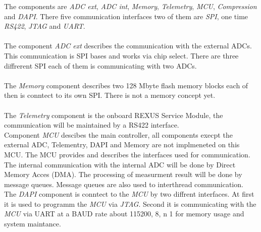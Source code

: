 The components are \textit{ADC ext}, \textit{ADC int}, \textit{Memory}, \textit{Telemetry}, \textit{MCU}, \textit{Compression} and \textit{DAPI}. There five communication interfaces two of them are \textit{SPI}, one time \textit{RS422}, \textit{JTAG} and \textit{UART}.\\ \\
The component \textit{ADC ext} describes the communication with the external ADCs. This communication is SPI bases and works via chip select. There are three diffrerent SPI each of them is communicating with two ADCs. \\ \\
The \textit{Memory} component  describes two 128 Mbyte flash memory blocks each of then  is conntect to its own SPI. There is not a memory concept yet. \\ \\
The \textit{Telemetry} component is the onboard REXUS Service Module, the communication will be maintained by a RS422 interface. \\ 
Component \textit{MCU} descibes the main controller, all components execpt the external ADC, Telementry, DAPI and Memory are not implmeneted on this MCU. The MCU provides and describes the interfaces used for communication. The internal communication with the internal ADC will be done by Direct Memory Acces (DMA). The processing of measurment result will be done by message queues. Message queues are also used to interthread communication. \\ 
The \textit{DAPI} component is conntect to the \textit{MCU} by two diffrent interfaces. At first it is used to programm the \textit{MCU} via \textit{JTAG}. Second it is communicating with the \textit{MCU} via UART at a BAUD rate about 115200, 8, n 1 for memory usage and system maintance. 